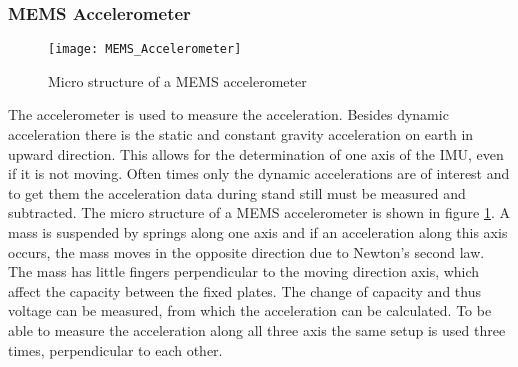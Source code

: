 \subsubsection{MEMS Accelerometer}
\begin{figure}[htb]
	\centering
	\texttt{[image: MEMS\_Accelerometer]}
	\caption{Micro structure of a MEMS accelerometer }
	\label{fig:MEMS_Accelerometer}
\end{figure}
The accelerometer is used to measure the acceleration.
Besides dynamic acceleration there is the static and constant gravity acceleration on earth in upward direction.
This allows for the determination of one axis of the IMU, even if it is not moving.
Often times only the dynamic accelerations are of interest and to get them the acceleration data during stand still must be measured and subtracted.
The micro structure of a MEMS accelerometer is shown in figure \ref{fig:MEMS_Accelerometer}.
A mass is suspended by springs along one axis and if an acceleration along this axis occurs, the mass moves in the opposite direction due to Newton's second law.
The mass has little fingers perpendicular to the moving direction axis, which affect the capacity between the fixed plates.
The change of capacity and thus voltage can be measured, from which the acceleration can be calculated.
To be able to measure the acceleration along all three axis the same setup is used three times, perpendicular to each other.

